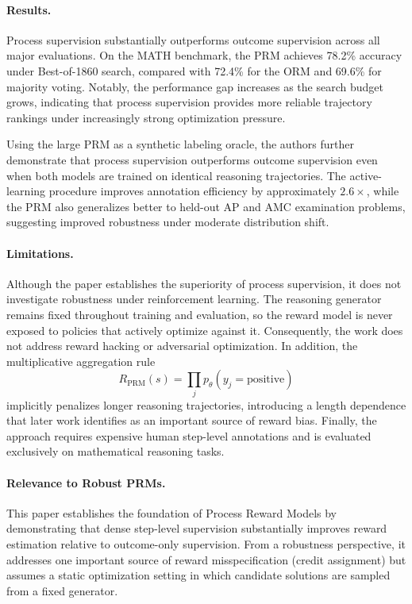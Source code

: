 \documentclass[11pt]{article}
\begin{document}
\paragraph{Results.}
Process supervision substantially outperforms outcome supervision across all major evaluations. On the MATH benchmark, the PRM achieves 78.2\% accuracy under Best-of-1860 search, compared with 72.4\% for the ORM and 69.6\% for majority voting. Notably, the performance gap increases as the search budget grows, indicating that process supervision provides more reliable trajectory rankings under increasingly strong optimization pressure.

Using the large PRM as a synthetic labeling oracle, the authors further demonstrate that process supervision outperforms outcome supervision even when both models are trained on identical reasoning trajectories. The active-learning procedure improves annotation efficiency by approximately \(2.6\times\), while the PRM also generalizes better to held-out AP and AMC examination problems, suggesting improved robustness under moderate distribution shift.

\paragraph{Limitations.}
Although the paper establishes the superiority of process supervision, it does not investigate robustness under reinforcement learning. The reasoning generator remains fixed throughout training and evaluation, so the reward model is never exposed to policies that actively optimize against it. Consequently, the work does not address reward hacking or adversarial optimization. In addition, the multiplicative aggregation rule
\[
R_{\mathrm{PRM}}(s)
=
\prod_j
p_\theta(y_j=\mathrm{positive})
\]
implicitly penalizes longer reasoning trajectories, introducing a length dependence that later work identifies as an important source of reward bias. Finally, the approach requires expensive human step-level annotations and is evaluated exclusively on mathematical reasoning tasks.

\paragraph{Relevance to Robust PRMs.}
This paper establishes the foundation of Process Reward Models by demonstrating that dense step-level supervision substantially improves reward estimation relative to outcome-only supervision. From a robustness perspective, it addresses one important source of reward misspecification (credit assignment) but assumes a static optimization setting in which candidate solutions are sampled from a fixed generator. 
\end{document}
